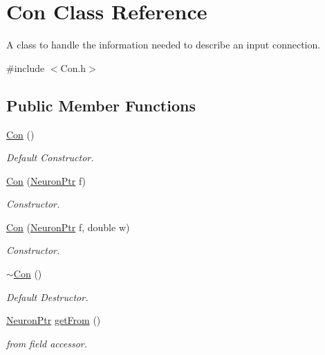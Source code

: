 \hypertarget{class_con}{
\section{Con Class Reference}
\label{class_con}
}


A class to handle the information needed to describe an input connection.  




{\ttfamily \#include $<$Con.h$>$}

\subsection*{Public Member Functions}
\begin{DoxyCompactItemize}
\item 
\hyperlink{class_con_a61621054cc1ee979385c81207ee0bceb}{Con} ()
\begin{DoxyCompactList}\small\item\em Default Constructor. \end{DoxyCompactList}\item 
\hyperlink{class_con_a6ba65bf2b0a20feedaa039cbb5067950}{Con} (\hyperlink{_a_m_o_r_e_8h_ac1ea936c2c7728eb382278131652fef4}{NeuronPtr} f)
\begin{DoxyCompactList}\small\item\em Constructor. \end{DoxyCompactList}\item 
\hyperlink{class_con_ae1a9d9cbe119d8f658a7cf9073b3e804}{Con} (\hyperlink{_a_m_o_r_e_8h_ac1ea936c2c7728eb382278131652fef4}{NeuronPtr} f, double w)
\begin{DoxyCompactList}\small\item\em Constructor. \end{DoxyCompactList}\item 
\hyperlink{class_con_a703b044611253c7a0a9e057ed62a3d22}{$\sim$Con} ()
\begin{DoxyCompactList}\small\item\em Default Destructor. \end{DoxyCompactList}\item 
\hyperlink{_a_m_o_r_e_8h_ac1ea936c2c7728eb382278131652fef4}{NeuronPtr} \hyperlink{class_con_a0c126eb4479324b156768e0810723423}{getFrom} ()
\begin{DoxyCompactList}\small\item\em from field accessor. \end{DoxyCompactList}\item 

\end{DoxyCompactItemize}
